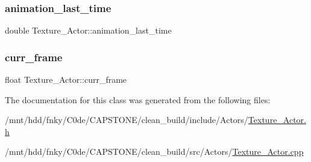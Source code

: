 \subsubsection{\texorpdfstring{animation\+\_\+last\+\_\+time}{animation\_last\_time}}
{\footnotesize\ttfamily double Texture\+\_\+\+Actor\+::animation\+\_\+last\+\_\+time\hspace{0.3cm}{\ttfamily [private]}}

\mbox{\label{classTexture__Actor_a53fa0809792b2afdf41f0cad391a4cbf}} 
\subsubsection{\texorpdfstring{curr\+\_\+frame}{curr\_frame}}
{\footnotesize\ttfamily float Texture\+\_\+\+Actor\+::curr\+\_\+frame\hspace{0.3cm}{\ttfamily [private]}}



The documentation for this class was generated from the following files\+:\begin{DoxyCompactItemize}
\item 
/mnt/hdd/fnky/\+C0de/\+C\+A\+P\+S\+T\+O\+N\+E/clean\+\_\+build/include/\+Actors/\hyperlink{Texture__Actor_8h}{Texture\+\_\+\+Actor.\+h}\item 
/mnt/hdd/fnky/\+C0de/\+C\+A\+P\+S\+T\+O\+N\+E/clean\+\_\+build/src/\+Actors/\hyperlink{Texture__Actor_8cpp}{Texture\+\_\+\+Actor.\+cpp}\end{DoxyCompactItemize}
